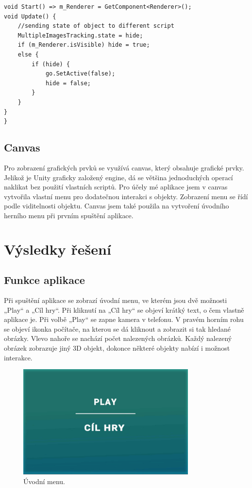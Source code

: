 \documentclass[12pt, a4paper,
twoside,        %
openright
]{report}
\begin{document}
\begin{lstlisting}[style=csh, caption={Ukázka kódu zjišťování viditelnosti objektu.}]
 void Start() => m_Renderer = GetComponent<Renderer>();
void Update() {
	//sending state of object to different script
	MultipleImagesTracking.state = hide;
	if (m_Renderer.isVisible) hide = true;
	else {
		if (hide) {
			go.SetActive(false);
			hide = false;
		}
	}
}
}
\end{lstlisting}


\section{Canvas}
\label{sec:canvas}
Pro zobrazení grafických prvků se využívá canvas, který obsahuje grafické prvky. Jelikož je Unity graficky založený engine, dá se většina jednoduchých operací naklikat bez použití vlastních scriptů. Pro účely mé aplikace jsem v canvas vytvořila vlastní menu pro dodatečnou interakci s objekty. Zobrazení menu se řídí podle viditelnosti objektu. Canvas jsem také použila na vytvoření úvodního herního menu při prvním spuštění aplikace. 


\chapter{Výsledky řešení}

\section{Funkce aplikace}
\label{funkce_aplikace}
Při spuštění aplikace se zobrazí úvodní menu, ve kterém jsou dvě možnosti „Play“ a „Cíl hry“. Při kliknutí na „Cíl hry“ se objeví krátký text, o čem vlastně aplikace je. 
Při volbě „Play“ se zapne kamera v telefonu. V pravém horním rohu se objeví ikonka počítače, na kterou se dá kliknout a zobrazit si tak hledané obrázky. Vlevo nahoře se nachází počet nalezených obrázků. 
Každý nalezený obrázek zobrazuje jiný 3D objekt, dokonce některé objekty nabízí i možnost interakce. 

	
	
	\begin{figure}[h!]
		\centering 
		\includegraphics[width=0.8\textwidth]{image/menu.jpg} 
		\caption{Úvodní menu.} 
		\label{fig:menu} 
	\end{figure}
	
\end{document}
